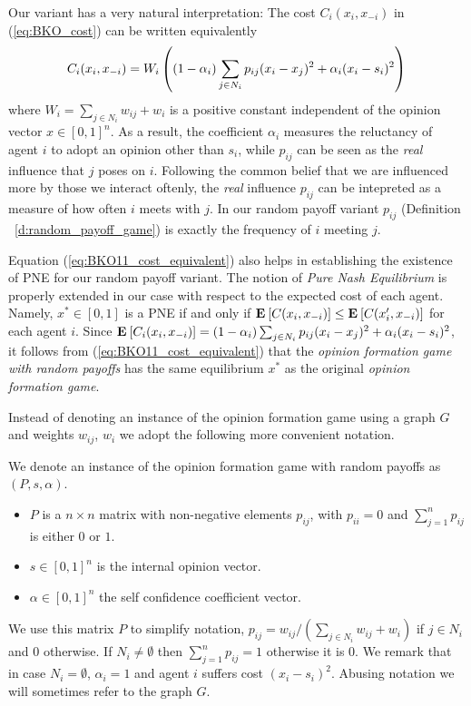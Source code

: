 Our variant has a very natural interpretation: The cost $C_i(x_i,x_{-i})$ in (\ref{eq:BKO_cost})
can be written equivalently
\begin{equation}\label{eq:BKO11_cost_equivalent}
C_i(x_i,x_{-i}) = W_i\left( (1-\alpha_i)\sum_{j \in N_i} p_{ij}(x_i-x_j)^2  + \alpha_i(x_i-s_i)^2\right)
\end{equation}
where $W_i=\sum_{j\in N_i}w_{ij} + w_i$ is a positive constant independent
 of the opinion vector $x\in [0,1]^n$. As a result, the coefficient $\alpha_i$
measures the reluctancy of agent $i$ to adopt an opinion other than $s_i$, while 
$p_{ij}$ can be seen as the \emph{real} influence that $j$ poses on $i$.
Following the common belief that we are influenced more by those we interact oftenly,
 the \emph{real} influence $p_{ij}$ can be intepreted as a measure of how
often $i$ meets with $j$. In our random payoff variant $p_{ij}$ 
(Definition ~\ref{d:random_payoff_game}) is exactly the frequency of $i$ meeting $j$. 

Equation (\ref{eq:BKO11_cost_equivalent}) also helps in establishing the existence of PNE for 
our random payoff variant. The notion of \emph{Pure Nash Equilibrium} is properly
 extended in our case with respect to the expected cost of each agent. Namely, 
$x^* \in [0,1]$ is a PNE if and only if $\Exp{C(x_i, x_{-i})} \leq \Exp{C(x_i', x_{-i})}$ 
for each agent $i$. Since $\bm{\mathrm{E}}_{} \left[ C_i(x_i,x_{-i}) \right]=(1-\alpha_i)\sum_{j \in N_i}p_{ij}(x_i-x_j)^2 + \alpha_i(x_i-s_i)^2$, 
it follows from (\ref{eq:BKO11_cost_equivalent}) that the 
\emph{opinion formation game with random payoffs} has the same equilibrium $x^*$ as 
the original \emph{opinion formation game}.

Instead of denoting an instance of the opinion formation game using a graph $G$
and weights $w_{ij}$, $w_i$ we adopt the following more convenient notation.

\begin{definition}\label{d:random_payof_game_instance}
We denote an instance of the opinion formation game with random payoffs as $(P,s,\alpha)$.
\begin{itemize}
 \item $P$ is a $n \times n$  matrix with non-negative elements $p_{ij}$,
  with $p_{ii}=0$ and $\sum_{j=1}^n p_{ij}$ is either $0$ or $1$.
 \item $s \in [0,1]^n$ is the internal opinion vector.
 \item $\alpha \in [0,1]^n$ the self confidence coefficient vector.
 \end{itemize}
\end{definition}
We use this matrix $P$ to simplify notation, $p_{ij} = w_{ij}/(\sum_{j \in N_i}w_{ij}+w_i)$ if $j \in N_i$ and $0$ otherwise.
If $N_i \neq \emptyset$ then $\sum_{j=1}^n p_{ij}=1$ otherwise it is $0$. We remark that in case $N_i=\emptyset$, $\alpha_i=1$
and agent $i$ suffers cost $(x_i-s_i)^2$.
Abusing notation we will sometimes refer to the graph $G$.


